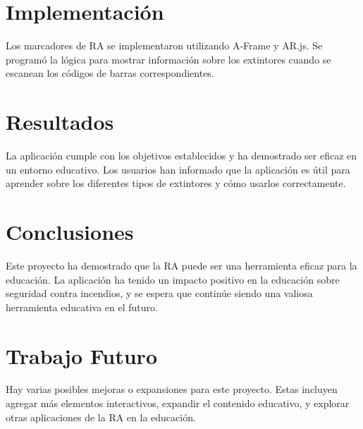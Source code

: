 \documentclass{article}
\begin{document}
\section{Implementación}
Los marcadores de RA se implementaron utilizando A-Frame y AR.js. Se programó la lógica para mostrar información sobre los extintores cuando se escanean los códigos de barras correspondientes.

\section{Resultados}
La aplicación cumple con los objetivos establecidos y ha demostrado ser eficaz en un entorno educativo. Los usuarios han informado que la aplicación es útil para aprender sobre los diferentes tipos de extintores y cómo usarlos correctamente.

\section{Conclusiones}
Este proyecto ha demostrado que la RA puede ser una herramienta eficaz para la educación. La aplicación ha tenido un impacto positivo en la educación sobre seguridad contra incendios, y se espera que continúe siendo una valiosa herramienta educativa en el futuro.

\section{Trabajo Futuro}
Hay varias posibles mejoras o expansiones para este proyecto. Estas incluyen agregar más elementos interactivos, expandir el contenido educativo, y explorar otras aplicaciones de la RA en la educación.
\end{document}
